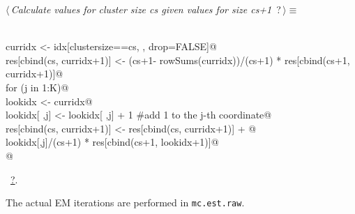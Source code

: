 \documentclass[reqno]{amsart}
\renewcommand{\NWtarget}[2]{\hypertarget{#1}{#2}}
\renewcommand{\NWlink}[2]{\hyperlink{#1}{#2}}
\begin{document}
\begin{flushleft} \small
\begin{minipage}{\linewidth}\label{scrap26}\raggedright\small
\NWtarget{nuweb?}{} $\langle\,${\itshape Calculate values for cluster size cs given values for size cs+1}\nobreak\ {\footnotesize {?}}$\,\rangle\equiv$
\vspace{-1ex}
\begin{list}{}{} \item
\mbox{}\verb@@\\
\mbox{}\verb@  curridx <- idx[clustersize==cs, , drop=FALSE]@\\
\mbox{}\verb@  res[cbind(cs, curridx+1)] <- (cs+1- rowSums(curridx))/(cs+1) * res[cbind(cs+1, curridx+1)]@\\
\mbox{}\verb@  for (j in 1:K){@\\
\mbox{}\verb@    lookidx <- curridx@\\
\mbox{}\verb@    lookidx[ ,j] <- lookidx[ ,j] + 1   #add 1 to the j-th coordinate@\\
\mbox{}\verb@    res[cbind(cs, curridx+1)] <- res[cbind(cs, curridx+1)] + @\\
\mbox{}\verb@                                 lookidx[,j]/(cs+1) * res[cbind(cs+1, lookidx+1)]@\\
\mbox{}\verb@  }  @\\
\mbox{}\verb@@{\NWsep}
\end{list}
\vspace{-1.5ex}
\footnotesize
\begin{list}{}{\setlength{\itemsep}{-\parsep}\setlength{\itemindent}{-\leftmargin}}
\item \NWtxtMacroRefIn\ \NWlink{nuweb?}{?}.

\item{}
\end{list}
\end{minipage}\vspace{4ex}
\end{flushleft}
The actual EM iterations are performed in \texttt{mc.est.raw}. 
\end{document}

